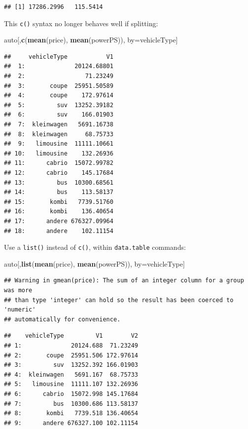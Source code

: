 \documentclass[]{book}
\newenvironment{Shaded}{\begin{snugshade}}{\end{snugshade}}
\newcommand{\KeywordTok}[1]{\textcolor[rgb]{0.13,0.29,0.53}{\textbf{#1}}}
\newcommand{\NormalTok}[1]{#1}
\theoremstyle{definition}
\theoremstyle{definition}
\theoremstyle{definition}
\theoremstyle{remark}
\begin{document}
\begin{verbatim}
## [1] 17286.2996   115.5414
\end{verbatim}

This \texttt{c()} syntax no longer behaves well if splitting:

\begin{Shaded}
\begin{Highlighting}[]
\NormalTok{auto[,}\KeywordTok{c}\NormalTok{(}\KeywordTok{mean}\NormalTok{(price), }\KeywordTok{mean}\NormalTok{(powerPS)), by=vehicleType]}
\end{Highlighting}
\end{Shaded}

\begin{verbatim}
##     vehicleType           V1
##  1:              20124.68801
##  2:                 71.23249
##  3:       coupe  25951.50589
##  4:       coupe    172.97614
##  5:         suv  13252.39182
##  6:         suv    166.01903
##  7:  kleinwagen   5691.16738
##  8:  kleinwagen     68.75733
##  9:   limousine  11111.10661
## 10:   limousine    132.26936
## 11:      cabrio  15072.99782
## 12:      cabrio    145.17684
## 13:         bus  10300.68561
## 14:         bus    113.58137
## 15:       kombi   7739.51760
## 16:       kombi    136.40654
## 17:      andere 676327.09964
## 18:      andere    102.11154
\end{verbatim}

Use a \texttt{list()} instead of \texttt{c()}, within
\texttt{data.table} commands:

\begin{Shaded}
\begin{Highlighting}[]
\NormalTok{auto[,}\KeywordTok{list}\NormalTok{(}\KeywordTok{mean}\NormalTok{(price), }\KeywordTok{mean}\NormalTok{(powerPS)), by=vehicleType]}
\end{Highlighting}
\end{Shaded}

\begin{verbatim}
## Warning in gmean(price): The sum of an integer column for a group was more
## than type 'integer' can hold so the result has been coerced to 'numeric'
## automatically for convenience.
\end{verbatim}

\begin{verbatim}
##    vehicleType         V1        V2
## 1:              20124.688  71.23249
## 2:       coupe  25951.506 172.97614
## 3:         suv  13252.392 166.01903
## 4:  kleinwagen   5691.167  68.75733
## 5:   limousine  11111.107 132.26936
## 6:      cabrio  15072.998 145.17684
## 7:         bus  10300.686 113.58137
## 8:       kombi   7739.518 136.40654
## 9:      andere 676327.100 102.11154
\end{verbatim}
\end{document}
